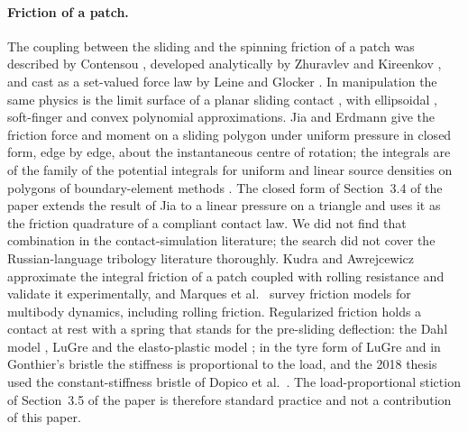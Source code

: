 \paragraph{Friction of a patch.} The coupling between the sliding and the spinning friction of
a patch was described by Contensou \cite{Contensou1963}, developed analytically by Zhuravlev
\cite{Zhuravlev1998} and Kireenkov \cite{Kireenkov2008}, and cast as a set-valued force law by
Leine and Glocker \cite{Leine2003}. In manipulation the same physics is the limit surface of a
planar sliding contact \cite{Goyal1991,Mason1986}, with ellipsoidal \cite{Howe1996},
soft-finger \cite{Xydas1999,Ciocarlie2007} and convex polynomial \cite{Zhou2018}
approximations. Jia and Erdmann \cite{Jia1997,Jia1999} give the friction force and moment on a
sliding polygon under uniform pressure in closed form, edge by edge, about the instantaneous
centre of rotation; the integrals are of the family of the potential integrals for uniform and
linear source densities on polygons of boundary-element methods \cite{Wilton1984}. The closed
form of Section~3.4 of the paper extends the result of Jia to a linear pressure on a triangle
and uses it as the friction quadrature of a compliant contact law. We did not find that
combination in the contact-simulation literature; the search did not cover the Russian-language
tribology literature thoroughly. Kudra and Awrejcewicz \cite{Kudra2011,Kudra2015} approximate
the integral friction of a patch coupled with rolling resistance and validate it
experimentally, and Marques et al.~\cite{Marques2016,Marques2019} survey friction models for
multibody dynamics, including rolling friction. Regularized friction holds a contact at rest
with a spring that stands for the pre-sliding deflection: the Dahl model \cite{Dahl1976}, LuGre
\cite{CanudasDeWit1995,Olsson1998} and the elasto-plastic model \cite{Dupont2002}; in the tyre
form of LuGre \cite{CanudasDeWit1999} and in Gonthier's bristle \cite{Gonthier2007thesis} the
stiffness is proportional to the load, and the 2018 thesis used the constant-stiffness bristle
of Dopico et al.~\cite{Dopico2011}. The load-proportional stiction of
Section~3.5 of the paper is therefore standard practice and not a contribution of this paper.

